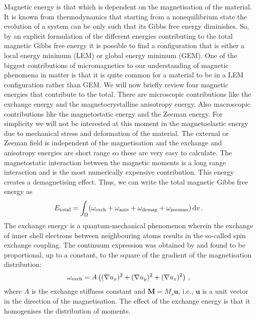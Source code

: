 Magnetic energy is that which is dependent on the magnetisation of the material. It is known from thermodynamics that starting from a nonequilibrium state the evolution of a system can be only such that its Gibbs free energy diminishes. So, by an explicit formulation of the different energies contributing to the total magnetic Gibbs free energy it is possible to find a configuration that is either a local energy minimum (LEM) or global energy minimum (GEM). One of the biggest contributions of micromagnetics to our understanding of magnetic phenomena in matter is that it is quite common for a material to be in a LEM configuration rather than GEM. We will now briefly review four magnetic energies that contribute to the total. There are microscopic contributions like the exchange energy and the magnetocrystalline anisotropy energy. Also macroscopic contributions like the magnetostatic energy and the Zeeman energy. For simplicity we will not be interested at this moment in the  magnetoelastic energy due to mechanical stress and deformation of the material. The external or Zeeman field is independent of the magnetisation and the exchange and anisotropy energies are short range so these are very easy to calculate. The magnetostatic interaction between the magnetic moments is a long range interaction and is the most numerically expensive contribution. This energy creates a demagnetising effect. Thus, we can write the total magnetic Gibbs free energy as
\begin{equation}\label{gibbs0}
E_{\textnormal{total}} = \int_{\Omega} (\omega_{\textnormal{exch}} + \omega_{\textnormal{anis}} + \omega_{\textnormal{demag}} + \omega_{\textnormal{zeeman}})\, \mathrm{d}v \, .
\end{equation}
The exchange energy is a quantum-mechanical phenomenon wherein the exchange of inner shell electrons between neighbouring atoms results in the so-called spin exchange coupling. The continuum expression was obtained by \citet{Landau} and found to be proportional, up to a constant, to the square of the gradient of the magnetisation distribution:
\begin{equation}
\omega_{\textnormal{exch}} = A \left( (\nabla u_x)^2 + (\nabla u_y)^2 + (\nabla u_z)^2 \right) \, ,
\end{equation}
where $A$ is the exchange stiffness constant and $\mathbf{M} = M_s\mathbf{u}$, i.e., $\mathbf{u}$ is a unit vector in the direction of the magnetisation. The effect of the exchange energy is that it homogenises the distribution of moments.\par

